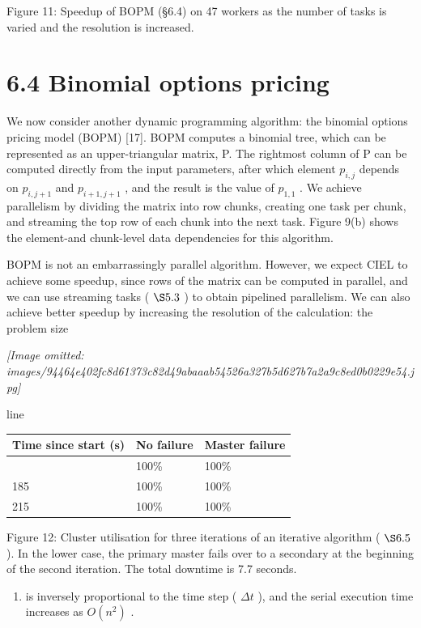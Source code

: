 \documentclass[
]{article}
\newcounter{none} %
\providecommand{\tightlist}{%
  \setlength{\itemsep}{0pt}\setlength{\parskip}{0pt}}
\begin{document}
Figure 11: Speedup of BOPM (§6.4) on 47 workers as the number of tasks
is varied and the resolution is increased.

\section{6.4 Binomial options pricing}\label{binomial-options-pricing}

We now consider another dynamic programming algorithm: the binomial
options pricing model (BOPM) {[}17{]}. BOPM computes a binomial tree,
which can be represented as an upper-triangular matrix, P. The rightmost
column of P can be computed directly from the input parameters, after
which element \(p_{i,j}\) depends on \(p_{i,j+1}\) and \(p_{i+1,j+1}\) ,
and the result is the value of \(p_{1,1}\) . We achieve parallelism by
dividing the matrix into row chunks, creating one task per chunk, and
streaming the top row of each chunk into the next task. Figure 9(b)
shows the element-and chunk-level data dependencies for this algorithm.

BOPM is not an embarrassingly parallel algorithm. However, we expect
CIEL to achieve some speedup, since rows of the matrix can be computed
in parallel, and we can use streaming tasks ( \(\S5.3\) ) to obtain
pipelined parallelism. We can also achieve better speedup by increasing
the resolution of the calculation: the problem size

\textit{[Image omitted: images/94464e402fc8d61373c82d49abaaab54526a327b5d627b7a2a9c8ed0b0229e54.jpg]}

line

{\def\LTcaptype{none} %
\begin{longtable}[]{@{}lll@{}}
\toprule\noalign{}
Time since start (s) & No failure & Master failure \\
\midrule\noalign{}
\endhead
\bottomrule\noalign{}
\endlastfoot
0 & 100\% & 100\% \\
185 & 100\% & 100\% \\
215 & 100\% & 100\% \\
\end{longtable}
}

Figure 12: Cluster utilisation for three iterations of an iterative
algorithm ( \(\S6.5\) ). In the lower case, the primary master fails
over to a secondary at the beginning of the second iteration. The total
downtime is 7.7 seconds.

\begin{enumerate}
\def\labelenumi{(\alph{enumi})}
\setcounter{enumi}{13}
\tightlist
\item
  is inversely proportional to the time step ( \(\Delta t\) ), and the
  serial execution time increases as \(O(n^{2})\) .
\end{enumerate}
\end{document}
